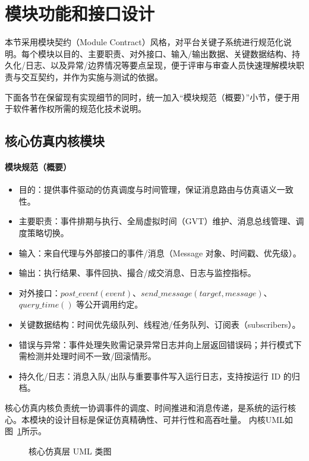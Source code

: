 \section{模块功能和接口设计}

本节采用模块契约（Module Contract）风格，对平台关键子系统进行规范化说明。每个模块以目的、主要职责、对外接口、输入/输出数据、关键数据结构、持久化/日志、以及异常/边界情况等要点呈现，便于评审与审查人员快速理解模块职责与交互契约，并作为实施与测试的依据。

下面各节在保留现有实现细节的同时，统一加入“模块规范（概要）”小节，便于用于软件著作权所需的规范化技术说明。

\subsection{核心仿真内核模块}

\paragraph{模块规范（概要）}
\begin{itemize}
  \item 目的：提供事件驱动的仿真调度与时间管理，保证消息路由与仿真语义一致性。
  \item 主要职责：事件排期与执行、全局虚拟时间（GVT）维护、消息总线管理、调度策略切换。
  \item 输入：来自代理与外部接口的事件/消息（Message 对象、时间戳、优先级）。
  \item 输出：执行结果、事件回执、撮合/成交消息、日志与监控指标。
  \item 对外接口：$post\_event(event)$、$send\_message(target,message)$、$query\_time()$ 等公开调用约定。
  \item 关键数据结构：时间优先级队列、线程池/任务队列、订阅表（subscribers）。
  \item 错误与异常：事件处理失败需记录异常日志并向上层返回错误码；并行模式下需检测并处理时间不一致/回滚情形。
  \item 持久化/日志：消息入队/出队与重要事件写入运行日志，支持按运行 ID 的归档。
\end{itemize}

核心仿真内核负责统一协调事件的调度、时间推进和消息传递，是系统的运行核心。本模块的设计目标是保证仿真精确性、可并行性和高吞吐量。
内核UML如图~\ref{fig:uml_core}所示。

\begin{figure}[H]
  \centering
  \resizebox{0.7\linewidth}{!}{}
  \caption{核心仿真层 UML 类图}
  \label{fig:uml_core}
\end{figure}

